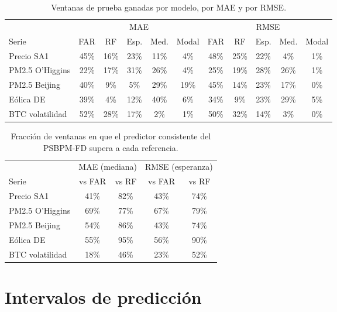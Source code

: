 \begin{table}[H]
\centering\small
\setlength{\tabcolsep}{3.5pt}
\caption{Ventanas de prueba ganadas por modelo, por MAE y por RMSE.}
\label{tab:aneD_bloqueA_ventanas}
\begin{tabular}{l ccccc ccccc}
\hline
 & \multicolumn{5}{c}{MAE} & \multicolumn{5}{c}{RMSE} \\
Serie & FAR & RF & Esp. & Med. & Modal & FAR & RF & Esp. & Med. & Modal \\
\hline
Precio SA1 & 45\% & 16\% & 23\% & 11\% & 4\% & 48\% & 25\% & 22\% & 4\% & 1\% \\
PM2.5 O'Higgins & 22\% & 17\% & 31\% & 26\% & 4\% & 25\% & 19\% & 28\% & 26\% & 1\% \\
PM2.5 Beijing & 40\% & 9\% & 5\% & 29\% & 19\% & 45\% & 14\% & 23\% & 17\% & 0\% \\
Eólica DE & 39\% & 4\% & 12\% & 40\% & 6\% & 34\% & 9\% & 23\% & 29\% & 5\% \\
BTC volatilidad & 52\% & 28\% & 17\% & 2\% & 1\% & 50\% & 32\% & 14\% & 3\% & 0\% \\
\hline
\end{tabular}
\end{table}

\begin{table}[H]
\centering\small
\setlength{\tabcolsep}{3.5pt}
\caption{Fracción de ventanas en que el predictor consistente del PSBPM-FD supera a cada referencia.}
\label{tab:aneD_bloqueA_gana}
\begin{tabular}{l cc cc}
\hline
 & \multicolumn{2}{c}{MAE (mediana)} & \multicolumn{2}{c}{RMSE (esperanza)} \\
Serie & vs FAR & vs RF & vs FAR & vs RF \\
\hline
Precio SA1 & 41\% & 82\% & 43\% & 74\% \\
PM2.5 O'Higgins & 69\% & 77\% & 67\% & 79\% \\
PM2.5 Beijing & 54\% & 86\% & 43\% & 74\% \\
Eólica DE & 55\% & 95\% & 56\% & 90\% \\
BTC volatilidad & 18\% & 46\% & 23\% & 52\% \\
\hline
\end{tabular}
\end{table}

\section{Intervalos de predicción}
\label{aneD_00_03_intervalos}

